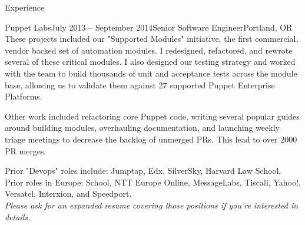 \documentclass{resume} %
\begin{document}
\begin{rSection}{Experience}
\begin{rSubsection}{Puppet Labs}{July 2013 -- September 2014}{Senior Software Engineer}{Portland, OR}
These projects included our "Supported Modules" initiative, the first
  commercial, vendor backed set of  automation modules.  I redesigned,
  refactored, and rewrote several of these critical modules.  I also designed
  our testing strategy and worked with the team to build thousands of unit and
  acceptance tests across the module base, allowing us to validate them against
  27 supported Puppet Enterprise Platforms.

Other work included refactoring core Puppet code, writing several popular
  guides around building modules, overhauling documentation, and launching
  weekly triage meetings to decrease the backlog of unmerged PRs.  This lead to
  over 2000 PR merges.

\end{rSubsection}

\begin{center}
Prior "Devops" roles include: Jumptap, Edx, SilverSky, Harvard Law School,\\
Prior roles in Europe: School, NTT Europe Online, MessageLabs, Tiscali, Yahoo!, Versatel, Interxion, and Speedport.\\
\textit{Please ask for an expanded resume covering those positions if you're interested in details.}
\end{center}

\end{rSection}
\end{document}

